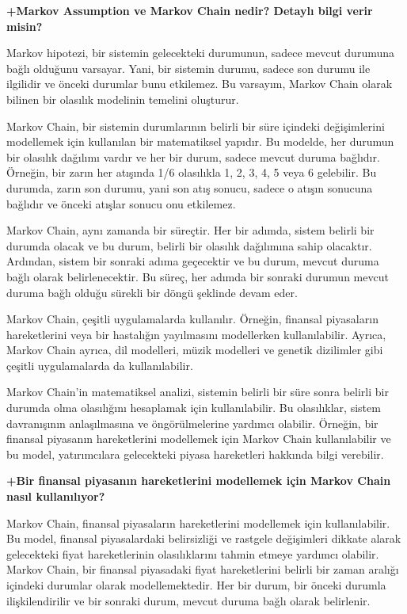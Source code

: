 \documentclass[11pt]{article}
\begin{document}
\textbf{+Markov Assumption ve Markov Chain nedir? Detaylı bilgi verir misin?}

Markov hipotezi, bir sistemin gelecekteki durumunun, sadece mevcut durumuna bağlı olduğunu varsayar. Yani, bir sistemin durumu, sadece son durumu ile ilgilidir ve önceki durumlar bunu etkilemez. Bu varsayım, Markov Chain olarak bilinen bir olasılık modelinin temelini oluşturur.

Markov Chain, bir sistemin durumlarının belirli bir süre içindeki değişimlerini modellemek için kullanılan bir matematiksel yapıdır. Bu modelde, her durumun bir olasılık dağılımı vardır ve her bir durum, sadece mevcut duruma bağlıdır. Örneğin, bir zarın her atışında 1/6 olasılıkla 1, 2, 3, 4, 5 veya 6 gelebilir. Bu durumda, zarın son durumu, yani son atış sonucu, sadece o atışın sonucuna bağlıdır ve önceki atışlar sonucu onu etkilemez.

Markov Chain, aynı zamanda bir süreçtir. Her bir adımda, sistem belirli bir durumda olacak ve bu durum, belirli bir olasılık dağılımına sahip olacaktır. Ardından, sistem bir sonraki adıma geçecektir ve bu durum, mevcut duruma bağlı olarak belirlenecektir. Bu süreç, her adımda bir sonraki durumun mevcut duruma bağlı olduğu sürekli bir döngü şeklinde devam eder.

Markov Chain, çeşitli uygulamalarda kullanılır. Örneğin, finansal piyasaların hareketlerini veya bir hastalığın yayılmasını modellerken kullanılabilir. Ayrıca, Markov Chain ayrıca, dil modelleri, müzik modelleri ve genetik dizilimler gibi çeşitli uygulamalarda da kullanılabilir.

Markov Chain'in matematiksel analizi, sistemin belirli bir süre sonra belirli bir durumda olma olasılığını hesaplamak için kullanılabilir. Bu olasılıklar, sistem davranışının anlaşılmasına ve öngörülmelerine yardımcı olabilir. Örneğin, bir finansal piyasanın hareketlerini modellemek için Markov Chain kullanılabilir ve bu model, yatırımcılara gelecekteki piyasa hareketleri hakkında bilgi verebilir.

\textbf{ +Bir finansal piyasanın hareketlerini modellemek için Markov Chain nasıl kullanılıyor?}

Markov Chain, finansal piyasaların hareketlerini modellemek için kullanılabilir. Bu model, finansal piyasalardaki belirsizliği ve rastgele değişimleri dikkate alarak gelecekteki fiyat hareketlerinin olasılıklarını tahmin etmeye yardımcı olabilir. Markov Chain, bir finansal piyasadaki fiyat hareketlerini belirli bir zaman aralığı içindeki durumlar olarak modellemektedir. Her bir durum, bir önceki durumla ilişkilendirilir ve bir sonraki durum, mevcut duruma bağlı olarak belirlenir.
\end{document}
